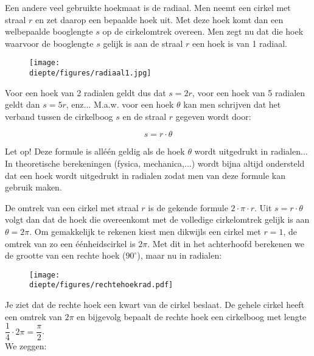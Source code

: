 \documentclass[a4paper,12pt]{article}
\newcommand{\diepte}{./}
\begin{document}
Een andere veel gebruikte hoekmaat is de radiaal. Men neemt een cirkel met straal $r$ en zet daarop een bepaalde hoek uit. Met deze hoek komt dan een welbepaalde booglengte $s$ op de cirkelomtrek overeen. Men zegt nu dat die hoek waarvoor de booglengte $s$ gelijk is aan de straal $r$ een hoek is van 1 radiaal.


\begin{figure}[h]
\begin{center}
\texttt{[image: \\diepte/figures/radiaal1.jpg]}
\end{center}
\end{figure}

Voor een hoek van 2 radialen geldt dus dat $s=2r$, voor een hoek van 5 radialen geldt dan $s=5r$, enz... M.a.w. voor een hoek $\theta$ kan men schrijven dat het verband tussen de cirkelboog $s$ en de straal $r$ gegeven wordt door:

\begin{framed}
\[ s=r\cdot \theta \]
\end{framed}

Let op! Deze formule is all\'{e}\'{e}n geldig als de hoek $\theta$ wordt uitgedrukt in radialen...\\

In theoretische berekeningen (fysica, mechanica,...) wordt bijna altijd ondersteld dat een hoek wordt uitgedrukt in radialen zodat men van deze formule kan gebruik maken.

De omtrek van een cirkel met straal $r$ is de gekende formule $2\cdot \pi \cdot r$. Uit $s=r\cdot \theta$ volgt dan dat de hoek die overeenkomt met de volledige cirkelomtrek gelijk is aan $\theta=2\pi$. Om gemakkelijk te rekenen kiest men dikwijls een cirkel met $r=1$, de omtrek van zo een \'{e}\'{e}nheidscirkel is $2\pi$.  Met dit in het achterhoofd berekenen we de grootte van een rechte hoek ($90^\circ$), maar nu in radialen:

\begin{figure}[h]
\begin{center}
\texttt{[image: \\diepte/figures/rechtehoekrad.pdf]}
\end{center}
\end{figure}

Je ziet dat de rechte hoek een kwart van de cirkel beslaat. De gehele cirkel heeft een omtrek van $2\pi$ en bijgevolg bepaalt de rechte hoek een cirkelboog met lengte $\dfrac{1}{4} \cdot 2\pi = \dfrac{\pi}{2}$.\\ We zeggen:
\end{document}
